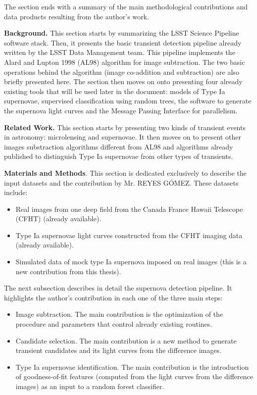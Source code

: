 \documentclass{article}
\begin{document}
The section ends with a summary of the main methodological contributions and data products resulting from the author's work. 

\vspace{1cm}
{\bf Background.} This section starts by summarizing the
LSST Science Pipeline software stack. Then, it presents the basic
transient detection pipeline already written by the LSST
Data Management team.
This pipeline implements the Alard and Lupton 1998 (AL98)
algorithm for image subtraction. The two basic operations
behind the algorithm (image co-addition and subtraction)
are also briefly presented here. The section then moves on
onto presenting four already existing  tools that will
be used later in the document: models of Type Ia
supernovae, supervised classification using random trees,
the software to generate the supernova light curves and the
Message Passing Interface for parallelism.

\vspace{1cm}
{\bf Related Work.} This section starts by presenting two kinds of transient events
in astronomy: microlensing and supernovae. It then moves on to present other images
substraction algorithms different from AL98 and algorithms already published to
distinguish Type Ia supernovae from other types of transients.

\vspace{1cm}
{\bf Materials and Methods}. This section is dedicated exclusively to describe the
input datasets and the contribution by Mr. REYES G\'OMEZ. These datasets include:
\begin{itemize}
    \item Real images from one deep field from the Canada France Hawaii Telescope
    (CFHT) (already available).
    \item Type Ia supernovae light curves constructed from the CFHT imaging data
    (already available).
    \item Simulated data of mock type Ia supernova imposed on real images (this is a
    new contribution from this thesis).
\end{itemize}

The next subsection describes in detail the supernova detection pipeline. 
It highlights the author's contribution in each one of the three main steps:
\begin{itemize}
    \item Image subtraction. The main
    contribution is the optimization of the procedure and
    parameters that control already existing routines.
    \item Candidate selection. The main contribution is a new method to generate
    transient candidates and its light curves from the difference images.
    \item Type Ia supernovae identification. The main 
    contribution is the introduction of goodness-of-fit
    features (computed from the light curves from the difference images) as an input to a random forest classifier.
\end{itemize}
\end{document}

